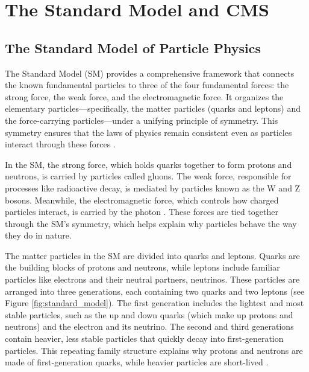 \chapter{The Standard Model and CMS}


\section{The Standard Model of Particle Physics}

The Standard Model (SM) provides a comprehensive framework that connects the known fundamental particles to three of the four fundamental forces: the strong force, the weak force, and the electromagnetic force. It organizes the elementary particles—specifically, the matter particles (quarks and leptons) and the force-carrying particles—under a unifying principle of symmetry. This symmetry ensures that the laws of physics remain consistent even as particles interact through these forces \cite{pich2012standardmodelelectroweakinteractions}.

In the SM, the strong force, which holds quarks together to form protons and neutrons, is carried by particles called gluons. The weak force, responsible for processes like radioactive decay, is mediated by particles known as the W and Z bosons. Meanwhile, the electromagnetic force, which controls how charged particles interact, is carried by the photon \cite{pich2012standardmodelelectroweakinteractions}. These forces are tied together through the SM’s symmetry, which helps explain why particles behave the way they do in nature.

The matter particles in the SM are divided into quarks and leptons. Quarks are the building blocks of protons and neutrons, while leptons include familiar particles like electrons and their neutral partners, neutrinos. These particles are arranged into three generations, each containing two quarks and two leptons (see Figure \ref{fig:standard_model}). The first generation includes the lightest and most stable particles, such as the up and down quarks (which make up protons and neutrons) and the electron and its neutrino. The second and third generations contain heavier, less stable particles that quickly decay into first-generation particles. This repeating family structure explains why protons and neutrons are made of first-generation quarks, while heavier particles are short-lived \cite{cush:standard-model}.

